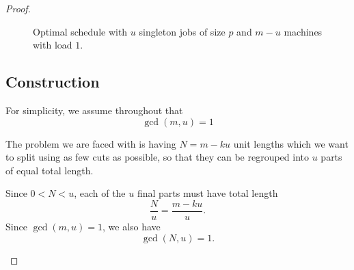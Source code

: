 \documentclass[%
english, titlepage=false %
]{./tum-templates/book/tumbook}
\newcommand{\machinerow}[2]{%
    \node[machine, anchor=east] at (-0.3,-#1+0.5) {$M_{#2}$};
}
\newcommand{\dotsrow}[1]{%
    \foreach \dy in {-0.18,0,0.18} { %
        \fill (-0.6,{-#1+0.5+\dy}) circle[radius=0.025];
        \fill (2,{-#1+0.5+\dy}) circle[radius=0.025];
    }
}
\newcommand{\jobblock}[5][white]{%
    \draw[job, fill=#1] (#3,-#2) rectangle ++(#4,1);
    \node at ({#3 + #4/2},{-#2 + 0.5}) {$#5$}; %
}
\begin{document}
\begin{proof}
\begin{figure}[ht]

\caption{Optimal schedule with $u$ singleton jobs of size $p$ and $m-u$ machines with load $1$.}
\label{fig:instance-structure}

\end{figure}
\subsection*{Construction}

For simplicity, we assume throughout that
\[
\gcd(m,u)=1
\]

The problem we are faced with is having \(N = m-ku\) unit lengths which we want to split using as few cuts as possible, so that they can be regrouped into \(u\) parts of equal total length.

Since \(0<N<u\), each of the \(u\) final parts must have total length
\[
\frac{N}{u}
=\frac{m-ku}{u}.
\]
Since \(\gcd(m,u)=1\), we also have
\[
\gcd(N,u)=1.
\]

\begin{figure}[ht]
\centering
{}
\end{figure}
\end{proof}
\end{document}
